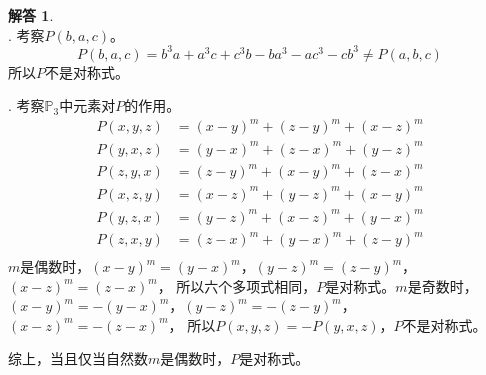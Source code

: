 \documentclass[12pt,UTF8]{ctexbook}
\newcommand{\dlim}[1]{^{\color{gray}\prime}#1}
\theoremstyle{definition}
\newtheorem*{so}{解答}
\theoremstyle{plain}
\begin{document}
\begin{so}
    \mbox{} \\
    . 考察$P(b, a, c)$。
    $$  P(b, a, c) = b^3a + a^3c + c^3b - ba^3 - ac^3 - cb^3 \neq P(a, b, c) $$
    所以$P$不是对称式。

    . 考察$\mathbb{P}_3$中元素对$P$的作用。
    \begin{align*}
        P(x, y, z) &= (x - y)^m + (z - y)^m + (x - z)^m \\
        P(y, x, z) &= (y - x)^m + (z - x)^m + (y - z)^m \\
        P(z, y, x) &= (z - y)^m + (x - y)^m + (z - x)^m \\
        P(x, z, y) &= (x - z)^m + (y - z)^m + (x - y)^m \\
        P(y, z, x) &= (y - z)^m + (x - z)^m + (y - x)^m \\
        P(z, x, y) &= (z - x)^m + (y - x)^m + (z - y)^m \\
    \end{align*}
    $m$是偶数时，$(x - y)^m = (y - x)^m$，$(y - z)^m = (z - y)^m$，$(x - z)^m = (z - x)^m$，
    所以六个多项式相同，$P$是对称式。$m$是奇数时，$(x - y)^m = -(y - x)^m$，$(y - z)^m = -(z - y)^m$，$(x - z)^m = -(z - x)^m$，
    所以$P(x, y, z) = -P(y, x, z) $，$P$不是对称式。

    综上，当且仅当自然数$m$是偶数时，$P$是对称式。
\end{so}




\end{document}
